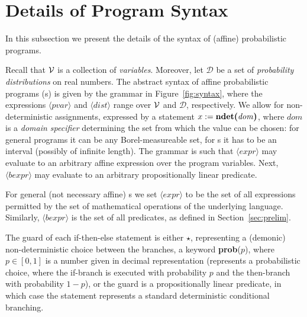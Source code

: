 \section{Details of Program Syntax}
In this subsection we present the details of the syntax of (affine) 
probabilistic 
programs.

Recall that $\mathcal{V}$ %
is a collection of 
\emph{variables}.
Moreover, let $\mathcal{D}$ be a set of \emph{probability distributions} on 
real numbers.
The abstract syntax of affine
probabilistic programs (\APP s)
is given by the grammar in Figure~\ref{fig:syntax}, where
the expressions $\langle \mathit{pvar}\rangle$ and $\langle
\mathit{dist}\rangle$  range over $\mathcal{V}$ and $\mathcal{D}$, respectively.
We allow for non-deterministic assignments, expressed by a statement $x:=
\text{\textbf{ndet($\mathit{dom}$)}}$, where $\mathit{dom}$ is a \emph{domain
specifier} determining the set from which the value can be chosen: for general 
programs it can be any Borel-measureable set, for \APP{}s it has to be an 
interval (possibly of infinite length).  
The grammar is such that $\langle \mathit{expr} \rangle$ %
may evaluate to an arbitrary affine expression over the
program variables.
Next, $\langle
\mathit{bexpr}\rangle$ may evaluate to an arbitrary propositionally linear
predicate. 

For general (not necessary affine) \PP{}s we set $\langle\mathit{expr}\rangle$ 
to be the set of all expressions permitted by the set of mathematical 
operations of the underlying language. Similarly, $\langle\mathit{bexpr} 
\rangle$ is the set of all predicates, as defined in Section~\ref{sec:prelim}.

The guard of each if-then-else statement is either $\star$, 
representing a (demonic) non-deterministic choice between the branches,
a keyword \textbf{prob}($p$), where $p\in [0,1]$ is a number given in decimal
representation (represents a probabilistic choice, where  the if-branch is
executed with probability $p$ and the then-branch with probability $1-p$), or
the guard is a propositionally linear predicate, in which case the statement
represents a standard deterministic conditional branching.

